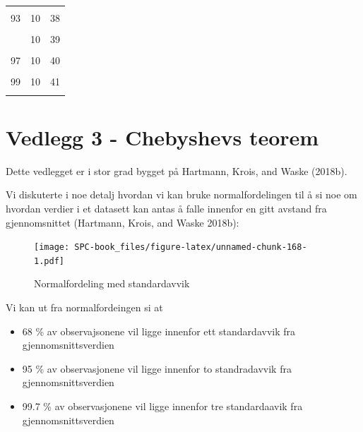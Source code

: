 \documentclass[
]{book}
\providecommand{\tightlist}{%
  \setlength{\itemsep}{0pt}\setlength{\parskip}{0pt}}
\begin{document}
\begin{longtable}[t]{ccc}
\cellcolor{gray!6}{92} & \cellcolor{gray!6}{10} & \cellcolor{gray!6}{38}\\
93 & 10 & 38\\
\cellcolor{gray!6}{94} & \cellcolor{gray!6}{10} & \cellcolor{gray!6}{39}\\
\addlinespace
95 & 10 & 39\\
\cellcolor{gray!6}{96} & \cellcolor{gray!6}{10} & \cellcolor{gray!6}{39}\\
97 & 10 & 40\\
\cellcolor{gray!6}{98} & \cellcolor{gray!6}{10} & \cellcolor{gray!6}{40}\\
99 & 10 & 41\\
\addlinespace
\cellcolor{gray!6}{100} & \cellcolor{gray!6}{10} & \cellcolor{gray!6}{41}\\*
\end{longtable}

\hypertarget{vedlegg-3---chebyshevs-teorem}{%
\chapter*{Vedlegg 3 - Chebyshevs teorem}\label{vedlegg-3---chebyshevs-teorem}}

Dette vedlegget er i stor grad bygget på Hartmann, Krois, and Waske (2018b).

Vi diskuterte i noe detalj hvordan vi kan bruke normalfordelingen til å si noe om hvordan verdier i et datasett kan antas å falle innenfor en gitt avstand fra gjennomsnittet (Hartmann, Krois, and Waske 2018b):

\begin{figure}
\centering
\texttt{[image: SPC-book\_files/figure-latex/unnamed-chunk-168-1.pdf]}
\caption{\label{fig:unnamed-chunk-168}Normalfordeling med standardavvik}
\end{figure}

Vi kan ut fra normalfordeingen si at

\begin{itemize}
\tightlist
\item
  68 \% av observajsonene vil ligge innenfor ett standardavvik fra gjennomsnittsverdien
\item
  95 \% av observasjonene vil ligge innenfor to standradavvik fra gjennomsnittsverdien
\item
  99.7 \% av observasjonene vil ligge innenfor tre standardaavik fra gjennomsnittsverdien
\end{itemize}
\end{document}
